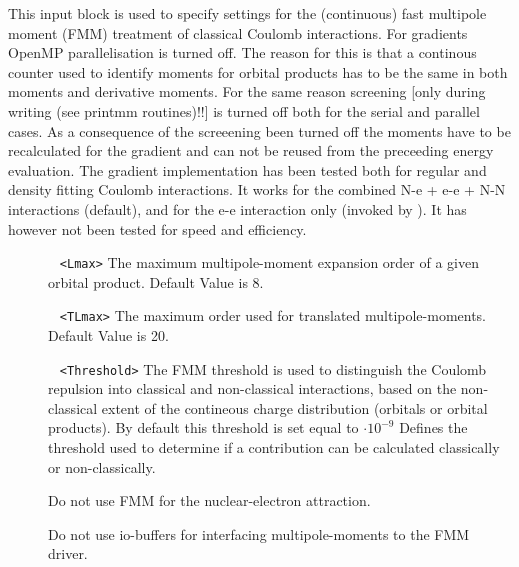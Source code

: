 This input block is used to specify settings for the (continuous) fast multipole moment (FMM) treatment of 
classical Coulomb interactions.\newline
%
%
For gradients OpenMP parallelisation is turned off. The reason for this is that a continous counter used 
to identify moments for orbital products has to be the same in both moments and derivative moments. 
For the same reason screening [only during writing (see printmm routines)!!] is turned off both for the serial 
and parallel cases. As a consequence of the screeening been turned off the moments have to be recalculated for the gradient and can not be reused from the preceeding energy evaluation. 
%
%
The gradient implementation has been tested both for regular and density fitting Coulomb interactions. 
It works for the combined N-e +  e-e + N-N interactions (default), 
and for the e-e interaction only (invoked by ).
It has however not been tested for speed and efficiency.
%
\begin{description}
\item[] \verb| |\newline
\verb|<Lmax>|\newline
The maximum multipole-moment expansion order of a given orbital product. Default Value is 8.
\item[] \verb| |\newline
\verb|<TLmax>|\newline
The maximum order used for translated multipole-moments. Default Value is 20.
\item[] \verb| |\newline
\verb|<Threshold>|\newline
The FMM threshold is used to distinguish the Coulomb repulsion into classical and non-classical interactions, based on the non-classical extent of the contineous charge distribution (orbitals or orbital products). 
By default this threshold is set equal to $\cdot 10^{-9}$ 
Defines the threshold used to determine if a contribution can be calculated classically or non-classically.
\item[] Do not use FMM for the nuclear-electron attraction.
\item[] Do not use io-buffers for interfacing multipole-moments to the FMM driver.
\end{description}

